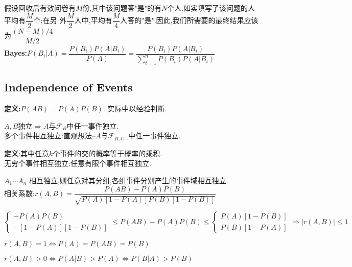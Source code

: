 假设回收后有效问卷有$M$份,其中该问题答"是"的有$N$个人.如实填写了该问题的人平均有$\dfrac{M}{2}$个;在另
外$ \dfrac{M}{2}$人中,平均有$ \dfrac{M}{4}$人答的"是".因此,我们所需要的最终结果应该为$ \dfrac{(N-M)/4}{M/2} $
\\

{\bf Bayes:}$ P(B_i|A) = \dfrac{P(B_i)P(A|B_i)}{P(A)} = \dfrac{P(B_i)P(A|B_i)}{\sum_{t=1}^n{P(B_t)P(A|B_t)}}$

\subsection{Independence of Events}
{\bf 定义:}$ P(AB)=P(A)P(B)$. 实际中以经验判断.

$ A,B$独立$ \Rightarrow A与\mathcal{F}_B$中任一事件独立.
\\

多个事件相互独立:直观想法--$ A与\mathcal{F}_{B,C\cdots}$中任一事件独立.

{\bf 定义}:其中任意$ k$个事件的交的概率等于概率的乘积.
\\

无穷个事件相互独立:任意有限个事件相互独立.

$ A_1\cdots A_n$ 相互独立,则任意对其分组,各组事件分别产生的事件域相互独立.
\\

相关系数:$ r(A,B)=\dfrac{P(AB)- P(A)P(B)}{\sqrt{P(A)[1-P(A)]P(B)[1-P(B)]}}$

$ \left \{\begin{matrix}-P(A)P(B)\\  -[1-P(A)][1-P(B)]\end{matrix} \right . \le P(AB)-P(A)P(B) \le \left \{ \begin{matrix} P(A)[1-P(B)]\\ P(B)[1-P(A)]\end{matrix}\right .
			\Rightarrow  |r(A,B)| \le 1$

$ r(A,B)=1\Leftrightarrow P(A)=P(AB)=P(B)$

$ r(A,B)>0\Leftrightarrow P(A|B)>P(A)\Leftrightarrow P(B|A)>P(B)$


